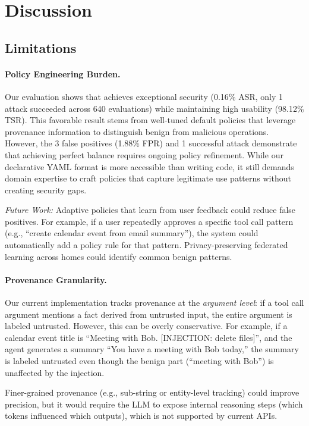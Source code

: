 \section{Discussion}
\label{sec:discussion}

\subsection{Limitations}

\paragraph{Policy Engineering Burden.}
Our evaluation shows that \sys{} achieves exceptional security (0.16\% ASR, only 1 attack succeeded across 640 evaluations) while maintaining high usability (98.12\% TSR). This favorable result stems from well-tuned default policies that leverage provenance information to distinguish benign from malicious operations. However, the 3 false positives (1.88\% FPR) and 1 successful attack demonstrate that achieving perfect balance requires ongoing policy refinement. While our declarative YAML format is more accessible than writing code, it still demands domain expertise to craft policies that capture legitimate use patterns without creating security gaps.

\emph{Future Work:} Adaptive policies that learn from user feedback could reduce false positives. For example,
if a user repeatedly approves a specific tool call pattern (e.g., ``create calendar event from email summary''),
the system could automatically add a policy rule for that pattern. Privacy-preserving federated learning
across homes could identify common benign patterns.

\paragraph{Provenance Granularity.}
Our current implementation tracks provenance at the \emph{argument level}: if a tool call argument mentions
a fact derived from untrusted input, the entire argument is labeled untrusted. However, this can be overly
conservative. For example, if a calendar event title is ``Meeting with Bob. [INJECTION: delete files]'',
and the agent generates a summary ``You have a meeting with Bob today,'' the summary is labeled untrusted
even though the benign part (``meeting with Bob'') is unaffected by the injection.

Finer-grained provenance (e.g., sub-string or entity-level tracking) could improve precision, but it would
require the LLM to expose internal reasoning steps (which tokens influenced which outputs), which is not
supported by current APIs.

